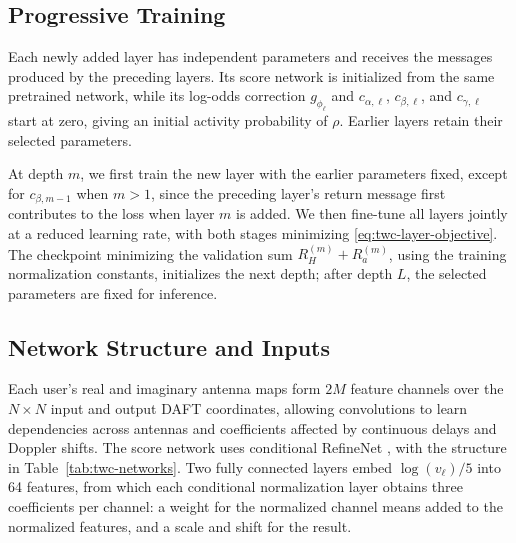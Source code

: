 \subsection{Progressive Training}

Each newly added layer has independent parameters and receives the
messages produced by the preceding layers. Its score network is
initialized from the same pretrained network, while its log-odds
correction $g_{\phi_\ell}$ and $c_{\alpha,\ell}$, $c_{\beta,\ell}$,
and $c_{\gamma,\ell}$ start at zero, giving an initial activity
probability of $\rho$.
Earlier layers retain their selected parameters.

At depth $m$, we first train the new layer with the earlier parameters
fixed, except for $c_{\beta,m-1}$ when $m>1$, since the preceding
layer's return message first contributes to the loss when layer $m$
is added. We then fine-tune all layers jointly at a reduced learning
rate, with both stages minimizing \eqref{eq:twc-layer-objective}.
The checkpoint minimizing the validation sum $R_H^{(m)}+R_a^{(m)}$,
using the training normalization constants, initializes the next
depth; after depth $L$, the selected parameters are fixed for inference.

\subsection{Network Structure and Inputs}

Each user's real and imaginary antenna maps form $2M$ feature channels
over the $N\times N$ input and output DAFT coordinates, allowing
convolutions to learn dependencies across antennas and coefficients
affected by continuous delays and Doppler shifts. The score network
uses conditional RefineNet \cite{cai2026,song2019}, with the structure
in Table~\ref{tab:twc-networks}. Two fully connected layers embed
$\log(v_\ell)/5$ into 64 features, from which each conditional
normalization layer obtains three coefficients per channel: a weight
for the normalized channel means added to the normalized features,
and a scale and shift for the result.


